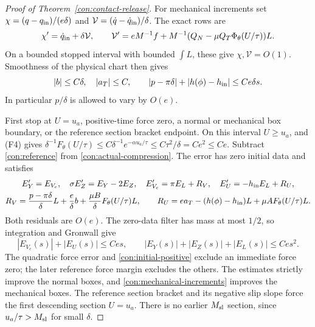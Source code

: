 \begin{proof}[Proof of Theorem~\ref{con:contact-release}]
For mechanical increments set
$\chi=(q-q_{\rm in})/(e\delta)$ and
$\mathcal V=(\dot q-\dot q_{\rm in})/\delta$.  The exact rows are
\begin{equation}
 \chi'=\dot q_{\rm in}+\delta\mathcal V,\qquad
 \mathcal V'=eM^{-1}f+
 M^{-1}(Q_N-\mu Q_T\Phi_\theta(U/\tau))L.
 \label{con:mechanical-increments}
\end{equation}
On a bounded stopped interval with bounded $\int L$, these give
$\chi,\mathcal V=O(1)$.  Smoothness of the physical chart then gives
\begin{equation}
 |b|\le C\delta,\quad |a_T|\le C,\qquad
 |p-\pi\delta|+|h(\phi)-h_{\rm in}|\le Ce\delta s.
 \label{con:coefficient-drift}
\end{equation}
In particular $p/\delta$ is allowed to vary by $O(e)$.

First stop at $U=u_a$, positive-time force zero, a normal or mechanical
box boundary, or the reference section bracket endpoint.  On this
interval $U\ge u_a$, and (F4) gives
$\delta^{-1}F_\theta(U/\tau)\le
C\delta^{-1}e^{-\alpha u_a/\tau}\le C\tau^2/\delta=Ce^2\le Ce$.
Subtract \eqref{con:reference} from \eqref{con:actual-compression}.
The error has zero initial data and satisfies
\begin{equation}
 \begin{gathered}
 E_Y'=E_{V_c},\quad \sigma E_Z'=E_Y-2E_Z,\quad
 E_{V_c}'=\pi E_L+R_V,\quad E_U'=-h_{\rm in}E_L+R_U,\\
 R_V=\frac{p-\pi\delta}{\delta}L+\frac e\delta b
       +\frac{\mu B}{\delta}F_\theta(U/\tau)L,\qquad
 R_U=ea_T-(h(\phi)-h_{\rm in})L+\mu AF_\theta(U/\tau)L.
 \end{gathered}
 \label{con:compression-error}
\end{equation}
Both residuals are $O(e)$.  The zero-data filter has mass at most
$1/2$, so integration and Gronwall give
\begin{equation}
 |E_{V_c}(s)|+|E_U(s)|\le Ces,\qquad
 |E_Y(s)|+|E_Z(s)|+|E_L(s)|\le Ces^2.
 \label{con:initial-error}
\end{equation}
The quadratic force error and \eqref{con:initial-positive} exclude
an immediate force zero; the later reference force margin excludes
the others.  The estimates strictly improve the normal boxes,
and \eqref{con:mechanical-increments} improves the mechanical boxes.
The reference section bracket and its negative slip slope force the
first descending section $U=u_a$.  There is no earlier $M_{\rm sl}$ section,
since $u_a/\tau>M_{\rm sl}$ for small $\delta$.


\end{proof}

